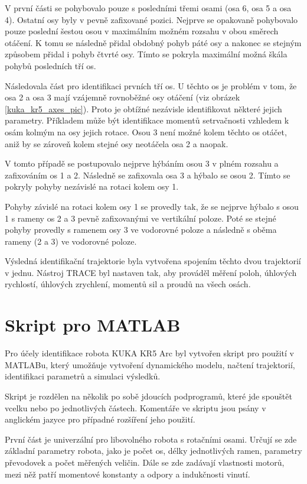 V první části se pohybovalo pouze s posledními třemi osami (osa 6, osa 5 a osa 4). Ostatní osy byly v pevně zafixované pozici. Nejprve se opakovaně pohybovalo pouze poslední šestou osou v maximálním možném rozsahu v obou směrech otáčení. K tomu se následně přidal obdobný pohyb páté osy a nakonec se stejným způsobem přidal i pohyb čtvrté osy. Tímto se pokryla maximální možná škála pohybů posledních tří os.

Následovala část pro identifikaci prvních tří os. U těchto os je problém v tom, že osa 2 a osa 3 mají vzájemně rovnoběžné osy otáčení (viz obrázek \ref{kuka_kr5_axes_pic}). Proto je obtížné nezávisle identifikovat některé jejich parametry. Příkladem může být identifikace momentů setrvačnosti vzhledem k osám kolmým na osy jejich rotace. Osou 3 není možné kolem těchto os otáčet, aniž by se zároveň kolem stejné osy neotáčela osa 2 a naopak.    

V tomto případě se postupovalo nejprve hýbáním osou 3 v plném rozsahu a zafixováním os 1 a 2. Následně se zafixovala osa 3 a hýbalo se osou 2. Tímto se pokryly pohyby nezávislé na rotaci kolem osy 1.

Pohyby závislé na rotaci kolem osy 1 se provedly tak, že se nejprve hýbalo s osou 1 s rameny os 2 a 3 pevně zafixovanými ve vertikální poloze. Poté se stejné pohyby provedly s ramenem osy 3 ve vodorovné poloze a následně s oběma rameny (2 a 3) ve vodorovné poloze.

Výsledná identifikační trajektorie byla vytvořena spojením těchto dvou trajektorií v jednu. Nástroj TRACE byl nastaven tak, aby prováděl měření poloh, úhlových rychlostí, úhlových zrychlení, momentů sil a proudů na všech osách. 

\section{Skript pro MATLAB}

Pro účely identifikace robota KUKA KR5 Arc byl vytvořen skript pro použití v MATLABu, který umožňuje vytvoření dynamického modelu, načtení trajektorií, identifikaci parametrů a simulaci výsledků.

Skript je rozdělen na několik po sobě jdoucích podprogramů, které jde spouštět vcelku nebo po jednotlivých částech. Komentáře ve skriptu jsou psány v anglickém jazyce pro případné rozšíření jeho použití.

První část je univerzální pro libovolného robota s rotačními osami. Určují se zde základní parametry robota, jako je počet os, délky jednotlivých ramen, parametry převodovek a počet měřených veličin. Dále se zde zadávají vlastnosti motorů, mezi něž patří momentové konstanty a odpory a indukčnosti vinutí. 

